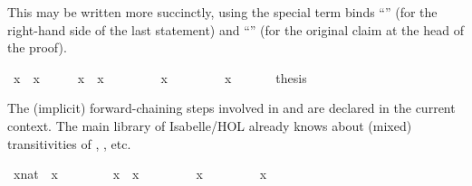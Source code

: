 \begin{isabellebody}
\begin{isamarkuptext}
This may be written more succinctly, using the special term binds
  ``\isa{{\isasymdots}}'' (for the right-hand side of the last statement) and
  ``'' (for the original claim at the head of the
  proof).%
\end{isamarkuptext}%
\isamarkuptrue%
\ {\isachardoublequote}x{}\ {\isacharequal}\ x{}{\isachardoublequote}\isanewline
\isamarkupfalse%
\ {\isacharminus}\isanewline
\ \ \isamarkupfalse%
\ {\isachardoublequote}x{}\ {\isacharequal}\ x{}{\isachardoublequote}\ \isamarkupfalse%
\isanewline
\ \ \isamarkupfalse%
\ \isamarkupfalse%
\ {\isachardoublequote}{\isasymdots}\ {\isacharequal}\ x{}{\isachardoublequote}\ \isamarkupfalse%
\isanewline
\ \ \isamarkupfalse%
\ \isamarkupfalse%
\ {\isachardoublequote}{\isasymdots}\ {\isacharequal}\ x{}{\isachardoublequote}\ \isamarkupfalse%
\isanewline
\ \ \isamarkupfalse%
\ \isamarkupfalse%
\ {\isacharquery}thesis\ \isamarkupfalse%
\isacommand{{\isachardot}}\isanewline
\isamarkupfalse%
\isamarkupfalse%
%
\begin{isamarkuptext}%
The (implicit) forward-chaining steps involved in  and
   are declared in the current context.  The main library
  of Isabelle/HOL already knows about (mixed) transitivities of \isa{{\isacharequal}}, \isa{{\isacharless}}, \isa{{\isasymle}} etc.%
\end{isamarkuptext}%
\isamarkuptrue%
\ {\isachardoublequote}{\isacharparenleft}x{}{\isacharcolon}{\isacharcolon}nat{\isacharparenright}\ {\isacharless}\ x{}{\isachardoublequote}\isanewline
\ \ %
\isanewline
\isamarkupfalse%
\ {\isacharminus}\isanewline
\ \ \isamarkupfalse%
\ {\isachardoublequote}x{}\ {\isacharless}\ x{}{\isachardoublequote}\ \isamarkupfalse%
\isanewline
\ \ \isamarkupfalse%
\ \isamarkupfalse%
\ {\isachardoublequote}{\isasymdots}\ {\isasymle}\ x{}{\isachardoublequote}\ \isamarkupfalse%
\isanewline
\ \ \isamarkupfalse%
\ \isamarkupfalse%
\ {\isachardoublequote}{\isasymdots}\ {\isacharequal}\ x{}{\isachardoublequote}\ \isamarkupfalse%

\end{isabellebody}
